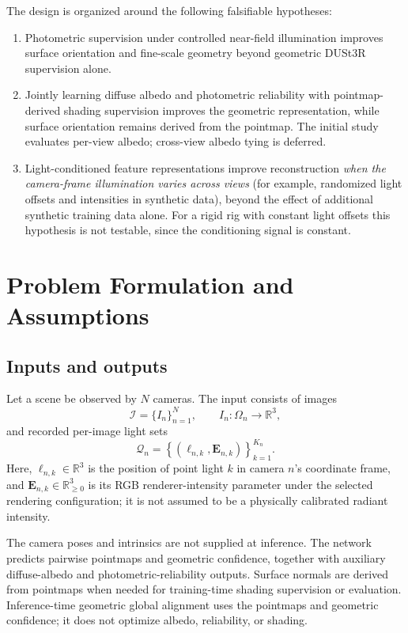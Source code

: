 \documentclass[11pt,a4paper]{article}
\newcommand{\R}{\mathbb{R}}
\begin{document}
The design is organized around the following falsifiable hypotheses:
\begin{enumerate}[label=\textbf{H\arabic*.}]
  \item Photometric supervision under controlled near-field illumination
  improves surface orientation and fine-scale geometry beyond geometric
  DUSt3R supervision alone.
  \item Jointly learning diffuse albedo and photometric reliability with
  pointmap-derived shading supervision improves the geometric representation,
  while surface orientation remains derived from the pointmap. The initial
  study evaluates per-view albedo; cross-view albedo tying is deferred.
  \item Light-conditioned feature representations improve reconstruction
  \emph{when the camera-frame illumination varies across views} (for
  example, randomized light offsets and intensities in synthetic data),
  beyond the effect of additional synthetic training data alone. For a rigid
  rig with constant light offsets this hypothesis is not testable, since the
  conditioning signal is constant.
\end{enumerate}

\section{Problem Formulation and Assumptions}

\subsection{Inputs and outputs}

Let a scene be observed by $N$ cameras. The input consists of images
\[
  \mathcal{I}=\{I_n\}_{n=1}^{N},
  \qquad
  I_n:\Omega_n\rightarrow\R^3,
\]
and recorded per-image light sets
\[
  \mathcal{Q}_n
  =
  \left\{
    (\bm{\ell}_{n,k},\bm{E}_{n,k})
  \right\}_{k=1}^{K_n}.
\]
Here, $\bm{\ell}_{n,k}\in\R^3$ is the position of point light $k$ in
camera $n$'s coordinate frame, and
$\bm{E}_{n,k}\in\R_{\geq 0}^{3}$ is its RGB renderer-intensity parameter under the selected
rendering configuration; it is not assumed to be a physically calibrated
radiant intensity.

The camera poses and intrinsics are not supplied at inference. The network
predicts pairwise pointmaps and geometric confidence, together with auxiliary
diffuse-albedo and photometric-reliability outputs. Surface normals are
derived from pointmaps when needed for training-time shading supervision or
evaluation. Inference-time geometric global alignment uses the pointmaps and
geometric confidence; it does not optimize albedo, reliability, or shading.
\end{document}
